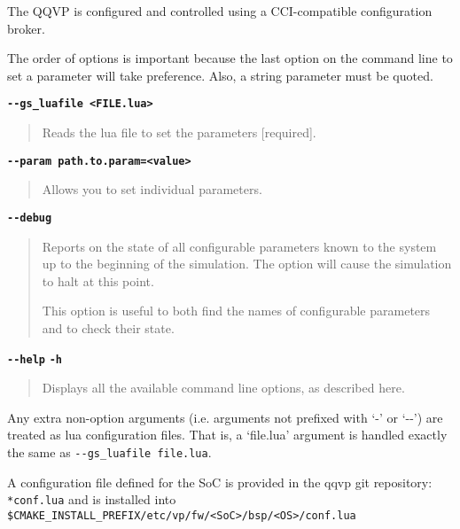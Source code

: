 The QQVP is configured and controlled using a CCI-compatible configuration broker.

The order of options is important because the last option on the command line to set a parameter will take preference. Also, a string parameter must be quoted.

{\textbf {\footnotesize{\lstinline!--gs_luafile <FILE.lua>!}}}
\vspace{-2pt}
\begin{quote}
Reads the lua file to set the parameters [required].
\end{quote}

{\textbf {\footnotesize{\lstinline!--param path.to.param=<value>!}}}
\vspace{-2pt}
\begin{quote}
Allows you to set individual parameters.
\end{quote}

{\textbf {\footnotesize{\lstinline!--debug!}}}
\vspace{-2pt}
\begin{quote}
Reports on the state of all configurable parameters known to the system up to the beginning of the simulation. The option will cause the simulation to halt at this point.

This option is useful to both find the names of configurable parameters and to check their state.
\end{quote}

{\textbf {\footnotesize{\lstinline!--help!}}} \newline
{\textbf {\footnotesize{\lstinline!-h!}}}
\vspace{-2pt}
\begin{quote}
Displays all the available command line options, as described here.
\end{quote}

Any extra non-option arguments (i.e. arguments not prefixed with `-' or `-{}-')
are treated as lua configuration files. That is, a `file.lua' argument is handled
exactly the same as {\footnotesize{\lstinline!--gs_luafile file.lua!}}.


A configuration file defined for the SoC is provided in the qqvp git
repository: {\small{\lstinline!*conf.lua!}} and is installed into
{\small{\lstinline!$CMAKE_INSTALL_PREFIX/etc/vp/fw/<SoC>/bsp/<OS>/conf.lua!}}

